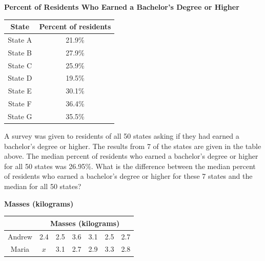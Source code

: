 \vspace{2em}


\newpage
\noindent\markforreview
\vspace{1em}

\textbf{Percent of Residents Who Earned a Bachelor's Degree or Higher}
\begin{center}
    

\begin{tabular}{|c|c|}
\hline
State & Percent of residents \\
\hline
State A & 21.9\% \\
State B & 27.9\% \\
State C & 25.9\% \\
State D & 19.5\% \\
State E & 30.1\% \\
State F & 36.4\% \\
State G & 35.5\% \\
\hline
\end{tabular}
\end{center}



A survey was given to residents of all 50 states asking if they had earned a bachelor’s degree or higher.  
The results from 7 of the states are given in the table above.  
The median percent of residents who earned a bachelor’s degree or higher for all 50 states was 26.95\%.  
What is the difference between the median percent of residents who earned a bachelor’s degree or higher for these 7 states and the median for all 50 states?

\vspace{0.75em}


\vspace{2em}



\noindent\markforreview

\begin{center}
    

\textbf{Masses (kilograms)}

\begin{tabular}{|c|c|c|c|c|c|c|}
\hline
 & \multicolumn{6}{c|}{Masses (kilograms)} \\
\hline
Andrew & 2.4 & 2.5 & 3.6 & 3.1 & 2.5 & 2.7 \\
\hline
Maria & $x$ & 3.1 & 2.7 & 2.9 & 3.3 & 2.8 \\
\hline
\end{tabular}
\end{center}

